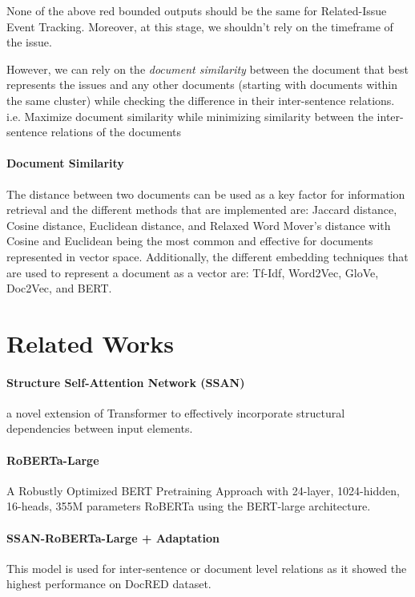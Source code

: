 \documentclass[sigconf,authorversion,nonacm]{acmart}
\begin{document}
None of the above red bounded outputs should be the same for Related-Issue Event Tracking. Moreover, at this stage, we shouldn’t rely on the timeframe of the issue.

However, we can rely on the \emph{document similarity} between the document that best represents the issues and any other documents (starting with documents within the same cluster) while checking the difference in their inter-sentence relations.
i.e. Maximize document similarity while minimizing similarity between the inter-sentence relations of the documents


\paragraph{Document Similarity}
The distance between two documents can be used as a key factor for information retrieval and the different methods that are implemented are: Jaccard distance, Cosine distance, Euclidean distance, and Relaxed Word Mover’s distance with Cosine and Euclidean being the most common and effective for documents represented in vector space. Additionally, the different embedding techniques that are used to represent a document as a vector are: Tf-Idf, Word2Vec, GloVe, Doc2Vec, and BERT.

\section{Related Works}
\paragraph{Structure Self-Attention Network (SSAN)}
a novel extension of Transformer to effectively incorporate structural dependencies between input elements.

\paragraph{RoBERTa-Large}
A Robustly Optimized BERT Pretraining Approach with 24-layer, 1024-hidden, 16-heads, 355M parameters RoBERTa using the BERT-large architecture.

\paragraph{SSAN-RoBERTa-Large + Adaptation}
This model is used for inter-sentence or document level relations as it showed the highest performance on DocRED dataset.
\end{document}
